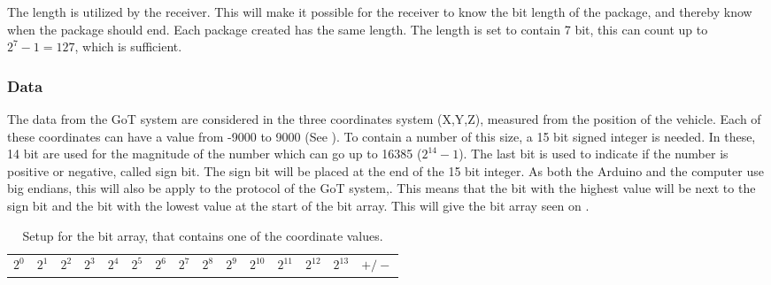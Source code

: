 The length is utilized by the receiver. This will make it possible for the receiver to know the bit length of the package, and thereby know when the package should end. Each package created has the same length. The length is set to contain 7 bit, this can count up to $2^{7}-1 = 127$, which is sufficient.

\subsubsection{Data}
The data from the GoT system are considered in the three coordinates system (X,Y,Z), measured from the position of the vehicle. Each of these coordinates can have a value from -9000 to 9000 (See ). To contain a number of this size, a 15 bit signed integer is needed. In these, 14 bit are used for the magnitude of the number which can go up to 16385 ($2^{14}-1$). The last bit is used to indicate if the number is positive or negative, called sign bit. The sign bit will be placed at the end of the 15 bit integer. As both the Arduino and the computer use big endians, this will also be apply to the protocol of the GoT system,. This means that the bit with the highest value will be next to the sign bit and the bit with the lowest value at the start of the bit array. This will give the bit array seen on .

\begin{table}[H]
\centering
\begin{tabular}{|>{\centering\arraybackslash}m{0.5cm}|>{\centering\arraybackslash}m{0.5cm}|>{\centering\arraybackslash}m{0.5cm}|>{\centering\arraybackslash}m{0.5cm}|>{\centering\arraybackslash}m{0.5cm}|>{\centering\arraybackslash}m{0.5cm}|>{\centering\arraybackslash}m{0.5cm}|>{\centering\arraybackslash}m{0.5cm}|>{\centering\arraybackslash}m{0.5cm}|>{\centering\arraybackslash}m{0.5cm}|>{\centering\arraybackslash}m{0.5cm}|>{\centering\arraybackslash}m{0.5cm}|>{\centering\arraybackslash}m{0.5cm}|>{\centering\arraybackslash}m{0.5cm}|>{\centering\arraybackslash}m{0.65cm}|}
\multicolumn{15}{c}{15 bits} \\
\hline
$2^0$ & $2^1$ & $2^2$ & $2^3$ & $2^4$ & $2^5$ & $2^6$ & $2^7$ & $2^8$ & $2^9$ & $2^{10}$ & $2^{11}$ & $2^{12}$ & $2^{13}$ & $+/-$ \\
\hline
\end{tabular}
\caption{Setup for the bit array, that contains one of the coordinate values.}
\label{CoorSetup}
\end{table}

